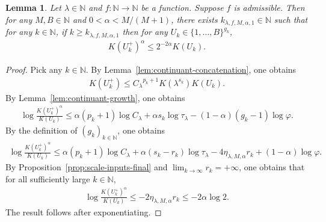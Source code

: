 \documentclass[12pt,reqno]{amsart}
\theoremstyle{definition}
\theoremstyle{plain}
\newtheorem{lemma}{Lemma}
\begin{document}
\begin{lemma}
\label{lem:full-stage-comparison}
Let $\lambda\in\mathbb{N}$ and $f:\mathbb{N}\to\mathbb{N}$ be a function. Suppose $f$ is admissible. Then for any $M,B\in\mathbb{N}$ and $0<\alpha<M/(M+1)$, there exists $k_{\lambda,f,M,\alpha,1}\in\mathbb{N}$ such that for any $k\in\mathbb{N}$, if $k\geq k_{\lambda,f,M,\alpha,1}$ then for any $U_k\in\{1,\ldots,B\}^{g_k}$,
\begin{align*}
    K(U^+_k)^\alpha
    \leq 2^{-2\alpha}K(U_k).
\end{align*}
\end{lemma}
\begin{proof}
Pick any $k\in\mathbb{N}$. By Lemma~\ref{lem:continuant-concatenation}, one obtains
\begin{align*}
    K(U^+_k)
    \leq
    {C_\lambda}^{p_k+1}K(\lambda^{s_k})K(U_k).
\end{align*}
By Lemma~\ref{lem:continuant-growth}, one obtains
\begin{align*}
    \log{\frac{K(U^+_k)^\alpha}{K(U_k)}}
    \leq
    \alpha(p_k+1)\log C_\lambda
    +\alpha s_k\log\tau_\lambda
    -(1-\alpha)(g_k-1)\log\varphi.
\end{align*}
By the definition of $(g_k)_{k\in\mathbb{N}}$, one obtains
\begin{align*}
    \log{\frac{K(U^+_k)^\alpha}{K(U_k)}}
    \leq
    \alpha(p_k+1)\log C_\lambda+\alpha(s_k-r_k)\log\tau_\lambda
    -4\eta_{\lambda,M,\alpha} r_k+(1-\alpha)\log{\varphi}.
\end{align*}
By Proposition~\ref{prop:scale-inputs-final} and $\lim_{k\to\infty}r_k=+\infty$, one obtains that for all sufficiently large $k\in\mathbb{N}$, 
\begin{align*}
    \log{\frac{K(U^+_k)^\alpha}{K(U_k)}}\leq-2\eta_{\lambda,M,\alpha} r_k\leq -2\alpha\log 2.
\end{align*}
The result follows after exponentiating.
\end{proof}
\end{document}
